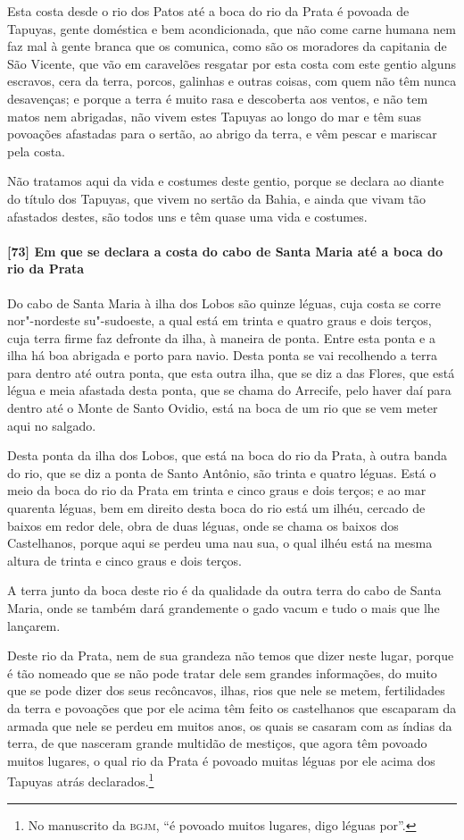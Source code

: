 Esta costa desde o rio dos Patos até a boca do rio da Prata é povoada de Tapuyas, gente
doméstica e bem acondicionada, que não come carne humana nem faz mal à gente branca que os
comunica, como são os moradores da capitania de São Vicente, que vão em caravelões
resgatar por esta costa com este gentio alguns escravos, cera da terra, porcos, galinhas e
outras coisas, com quem não têm nunca desavenças; e porque a terra é muito rasa e
descoberta aos ventos, e não tem matos nem abrigadas, não vivem estes Tapuyas ao longo do
mar e têm suas povoações afastadas para o sertão, ao abrigo da terra, e vêm pescar e
mariscar pela costa.

Não tratamos aqui da vida e costumes deste gentio, porque se declara ao diante do título
dos Tapuyas, que vivem no sertão da Bahia, e ainda que vivam tão afastados destes, são
todos uns e têm quase uma vida e costumes.

\paragraph{[73] Em que se declara a costa do cabo de Santa Maria até a boca do rio da Prata} \quad
Do cabo de Santa Maria à ilha dos Lobos são quinze léguas, cuja costa se corre
nor"-nordeste su"-sudoeste, a qual está em trinta e quatro graus e dois terços, cuja terra
firme faz defronte da ilha, à maneira de ponta. Entre esta ponta e a ilha há boa abrigada
e porto para navio. Desta ponta se vai recolhendo a terra para dentro até outra ponta, que
esta outra ilha, que se diz a das Flores, que está légua e meia afastada desta ponta, que
se chama do Arrecife, pelo haver daí para dentro até o Monte de Santo Ovidio, está na boca
de um rio que se vem meter aqui no salgado.

Desta ponta da ilha dos Lobos, que está na boca do rio da Prata, à outra banda do rio, que
se diz a ponta de Santo Antônio, são trinta e quatro léguas. Está o meio da boca do rio da
Prata em trinta e cinco graus e dois terços; e ao mar quarenta léguas, bem em direito
desta boca do rio está um ilhéu, cercado de baixos em redor dele, obra de duas léguas,
onde se chama os baixos dos Castelhanos, porque aqui se perdeu uma nau sua, o qual ilhéu
está na mesma altura de trinta e cinco graus e dois terços.

A terra junto da boca deste rio é da qualidade da outra terra do cabo de Santa Maria, onde
se também dará grandemente o gado vacum e tudo o mais que lhe lançarem.

Deste rio da Prata, nem de sua grandeza não temos que dizer neste lugar, porque é tão
nomeado que se não pode tratar dele sem grandes informações, do muito que se pode dizer
dos seus recôncavos, ilhas, rios que nele se metem, fertilidades da terra e povoações que
por ele acima têm feito os castelhanos que escaparam da armada que nele se perdeu em
muitos anos, os quais se casaram com as índias da terra, de que nasceram grande multidão
de mestiços, que agora têm povoado muitos lugares, o qual rio da Prata é povoado muitas
léguas por ele acima dos Tapuyas atrás declarados.\footnote{ No manuscrito da
\textsc{bgjm}, ``é povoado muitos lugares, digo léguas por''.}

